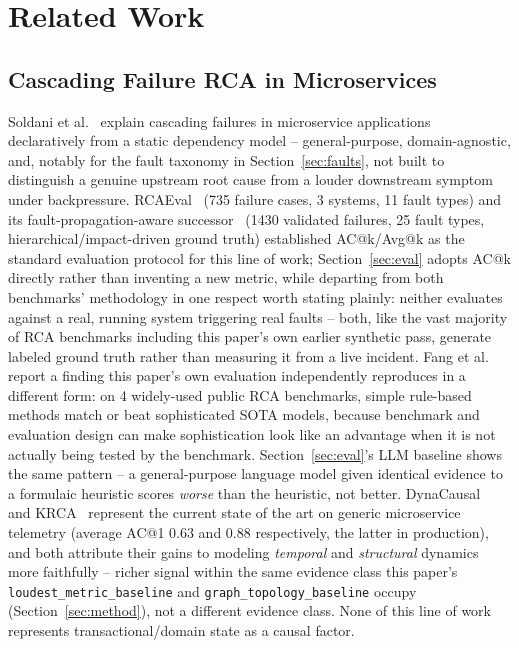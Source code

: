 \documentclass[conference]{IEEEtran}
\begin{document}
\section{Related Work}
\label{sec:related}

\subsection{Cascading Failure RCA in Microservices}
Soldani et al.~\cite{soldani2021} explain cascading failures in
microservice applications declaratively from a static dependency model --
general-purpose, domain-agnostic, and, notably for the fault taxonomy in
Section~\ref{sec:faults}, not built to distinguish a genuine upstream root
cause from a louder downstream symptom under backpressure.
RCAEval~\cite{rcaeval2024} (735 failure cases, 3 systems, 11 fault types)
and its fault-propagation-aware successor~\cite{fpa2025} (1430 validated
failures, 25 fault types, hierarchical/impact-driven ground truth)
established AC@k/Avg@k as the standard evaluation protocol for this line of
work; Section~\ref{sec:eval} adopts AC@k directly rather than inventing a
new metric, while departing from both benchmarks' methodology in one
respect worth stating plainly: neither evaluates against a real, running
system triggering real faults -- both, like the vast majority of RCA
benchmarks including this paper's own earlier synthetic pass, generate
labeled ground truth rather than measuring it from a live incident.
Fang et al.~\cite{fpa2025} report a finding this paper's own evaluation
independently reproduces in a different form: on 4 widely-used public RCA
benchmarks, simple rule-based methods match or beat sophisticated SOTA
models, because benchmark and evaluation design can make sophistication
look like an advantage when it is not actually being tested by the
benchmark. Section~\ref{sec:eval}'s LLM baseline shows the same pattern --
a general-purpose language model given identical evidence to a formulaic
heuristic scores \emph{worse} than the heuristic, not better.
DynaCausal~\cite{dynacausal2025} and KRCA~\cite{krca2026} represent the
current state of the art on generic microservice telemetry (average AC@1
0.63 and 0.88 respectively, the latter in production), and both attribute
their gains to modeling \emph{temporal} and \emph{structural} dynamics more
faithfully -- richer signal within the same evidence class this paper's
\texttt{loudest\_metric\_baseline} and \texttt{graph\_topology\_baseline}
occupy (Section~\ref{sec:method}), not a different evidence class. None of
this line of work represents transactional/domain state as a causal factor.
\end{document}
